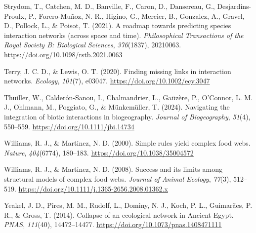\documentclass[
]{article}
\newlength{\cslhangindent}
\newenvironment{CSLReferences}[2] %
 {\begin{list}{}{%
  \setlength{\itemindent}{0pt}
  \setlength{\leftmargin}{0pt}
  \setlength{\parsep}{0pt}
  \ifodd #1
   \setlength{\leftmargin}{\cslhangindent}
   \setlength{\itemindent}{-1\cslhangindent}
  \fi
  \setlength{\itemsep}{#2\baselineskip}}}
 {\end{list}}
\begin{document}
\begin{CSLReferences}{1}{0}
Strydom, T., Catchen, M. D., Banville, F., Caron, D., Dansereau, G.,
Desjardins-Proulx, P., Forero-Muñoz, N. R., Higino, G., Mercier, B.,
Gonzalez, A., Gravel, D., Pollock, L., \& Poisot, T. (2021). A roadmap
towards predicting species interaction networks (across space and time).
\emph{Philosophical Transactions of the Royal Society B: Biological
Sciences}, \emph{376}(1837), 20210063.
\url{https://doi.org/10.1098/rstb.2021.0063}

Terry, J. C. D., \& Lewis, O. T. (2020). Finding missing links in
interaction networks. \emph{Ecology}, \emph{101}(7), e03047.
\url{https://doi.org/10.1002/ecy.3047}

Thuiller, W., Calderón-Sanou, I., Chalmandrier, L., Gaüzère, P.,
O'Connor, L. M. J., Ohlmann, M., Poggiato, G., \& Münkemüller, T.
(2024). Navigating the integration of biotic interactions in
biogeography. \emph{Journal of Biogeography}, \emph{51}(4), 550--559.
\url{https://doi.org/10.1111/jbi.14734}

Williams, R. J., \& Martinez, N. D. (2000). Simple rules yield complex
food webs. \emph{Nature}, \emph{404}(6774), 180--183.
\url{https://doi.org/10.1038/35004572}

Williams, R. J., \& Martinez, N. D. (2008). Success and its limits among
structural models of complex food webs. \emph{Journal of Animal
Ecology}, \emph{77}(3), 512--519.
\url{https://doi.org/10.1111/j.1365-2656.2008.01362.x}

Yeakel, J. D., Pires, M. M., Rudolf, L., Dominy, N. J., Koch, P. L.,
Guimarães, P. R., \& Gross, T. (2014). Collapse of an ecological network
in {Ancient Egypt}. \emph{PNAS}, \emph{111}(40), 14472--14477.
\url{https://doi.org/10.1073/pnas.1408471111}

\end{CSLReferences}
\end{document}
